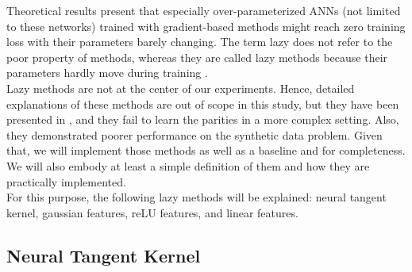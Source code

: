 \documentclass[a4paper, nobind]{templates/ociamthesis}
\begin{document}
Theoretical results present that especially over-parameterized ANNs (not limited to these networks) trained with gradient-based methods might reach zero training loss with their parameters barely changing. The term lazy does not refer to the poor property of methods, whereas they are called lazy methods because their parameters hardly move during training \cite{chizat2020lazy}.\\
Lazy methods are not at the center of our experiments. Hence, detailed explanations of these methods are out of scope in this study, but they have been presented in \cite{DBLP:journals/corr/abs-2002-07400, chizat2020implicit}, and they fail to learn the parities in a more complex setting. Also, they demonstrated poorer performance on the synthetic data problem. Given that, we will implement those methods as well as a baseline and for completeness. We will also embody at least a simple definition of them and how they are practically implemented.\\
For this purpose, the following lazy methods will be explained: neural tangent kernel, gaussian features, reLU features, and linear features.

\hypertarget{neural-tangent-kernel}{%
\subsection{Neural Tangent Kernel}\label{neural-tangent-kernel}}
\end{document}
